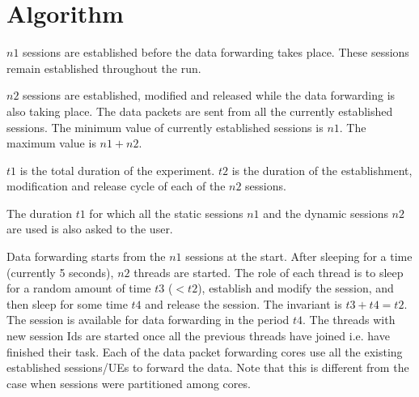 \section{Algorithm}
$n1$ sessions are established before the data forwarding takes place. These sessions remain established throughout the run.

$n2$ sessions are established, modified and released while the data forwarding is also taking place. The data packets are sent from all the currently established sessions. The minimum value of currently established sessions is $n1$. The maximum value is $n1+n2$.

$t1$ is the total duration of the experiment.
$t2$ is the  duration of the establishment, modification and release cycle of each of the $n2$ sessions.

The duration $t1$ for which all the static sessions $n1$ and the dynamic sessions $n2$ are used is also asked to the user.

Data forwarding starts from the $n1$ sessions at the start. After sleeping for a time (currently 5
seconds), $n2$ threads are started. The role of each thread is to sleep for a random amount of time
$t3$ ($<t2$), establish and modify the session, and then sleep for some time $t4$ and release the
session. The invariant is $t3+t4= t2$.   The session is available for data forwarding in the period $t4$.  The threads with new session Ids are started once all the previous threads have joined i.e. have finished their task.
Each of the data packet forwarding cores use all the existing established sessions/UEs to forward the data. Note that this is different from the case when sessions were partitioned among cores.

